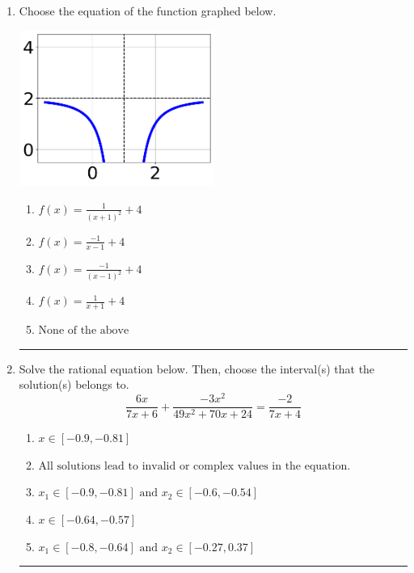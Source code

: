 \documentclass[14pt]{extbook}
\newcommand{\litem}[1]{\item#1\hspace*{-1cm}\rule{\textwidth}{0.4pt}}
\begin{document}
\begin{enumerate}
{\begin{enumerate}[label=\Alph*.]
\end{enumerate} }
\litem{
Choose the equation of the function graphed below.
\begin{center}
    \includegraphics[width=0.5\textwidth]{../Figures/rationalGraphToEquationC.png}
\end{center}
\begin{enumerate}[label=\Alph*.]
\item \( f(x) = \frac{1}{(x + 1)^2} + 4 \)
\item \( f(x) = \frac{-1}{x - 1} + 4 \)
\item \( f(x) = \frac{-1}{(x - 1)^2} + 4 \)
\item \( f(x) = \frac{1}{x + 1} + 4 \)
\item \( \text{None of the above} \)

\end{enumerate} }
\litem{
Solve the rational equation below. Then, choose the interval(s) that the solution(s) belongs to.\[ \frac{6x}{7x + 6} + \frac{-3x^{2}}{49x^{2} +70 x + 24} = \frac{-2}{7x + 4} \]\begin{enumerate}[label=\Alph*.]
\item \( x \in [-0.9,-0.81] \)
\item \( \text{All solutions lead to invalid or complex values in the equation.} \)
\item \( x_1 \in [-0.9, -0.81] \text{ and } x_2 \in [-0.6,-0.54] \)
\item \( x \in [-0.64,-0.57] \)
\item \( x_1 \in [-0.8, -0.64] \text{ and } x_2 \in [-0.27,0.37] \)


\end{enumerate}}
\end{enumerate}
\end{document}
